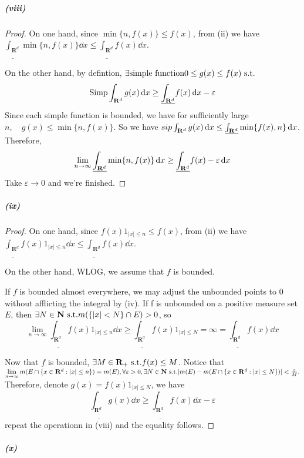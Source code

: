 \documentclass{article}
\begin{document}
\subparagraph{(viii)}
\begin{proof}
On one hand, since $\min\{n,f(x)\}\leq f(x)$, from (ii) we have $\underline{\int_{\mathbf{R}^d}}\min\{n,f(x)\}\dd x\leq \underline{\int_{\mathbf{R}^d}}f(x)\dd x$. 

On the other hand, by defintion, $\exists \text{simple function} 0\leq g(x)\leq f(x)\text{ s.t.}$ 
\[\mathrm{Simp}\int_{\mathbf{R}^d}g(x)\,\mathrm{d} x\geq \underline{\int_{\mathbf{R}^d}}f(x)\,\mathrm{d} x-\varepsilon\]
Since each simple function is bounded, we have for sufficiently large $n,\quad g(x)\leq \min\{n, f(x)\}$. So we have $\\sip\int_{\mathbf{R}^d}g(x)\,\mathrm{d} x\leq \underline{\int_{\mathbf{R}^d}}\min\{f(x),n\}\,\mathrm{d} x$. Therefore,
\[\lim_{n\to\infty}\uline{\int_{\mathbf{R}^d}}\min\{n,f(x)\}\dd x\geq \uline{\int_{\mathbf{R}^d}}f(x)-\varepsilon\dd x\]
Take $\varepsilon\to 0$ and we're finished. 
\end{proof}
\subparagraph{(ix)}
\begin{proof}
On one hand, since $f(x)1_{|x|\leq n}\leq f(x)$, from (ii) we have $\underline{\int_{\mathbf{R}^d}}f(x)1_{|x|\leq n}\dd x\leq \underline{\int_{\mathbf{R}^d}}f(x)\dd x$.

On the other hand, WLOG, we assume that $f$ is bounded.

If $f$ is bounded almost everywhere, we may adjust the unbounded points to 0 without afflicting the integral by (iv). If f is unbounded on a positive measure set $E$, then $\exists N\in\mathbf{N}\text{ s.t.} m(\{|x|<N\}\cap E)>0$, so \[\lim\limits_{n\to\infty}\underline{\int_{\mathbf{R}^d}}f(x)1_{|x|\leq n}\dd x\geq \underline{\int_{\mathbf{R}^d}}f(x)1_{|x|\leq N}=\infty=\underline{\int_{\mathbf{R}^d}}f(x)\dd x\]

Now that $f$ is bounded, $\exists M\in\mathbf{R}_+\text{ s.t.} f(x)\leq M$. Notice that $\lim\limits_{n\to\infty}m(E\cap\{x\in\mathbf{R}^d:|x|\leq n\})=m(E), \forall \varepsilon >0,\exists N\in\mathbf{N}\text{ s.t.} |m(E)-m(E\cap\{x\in\mathbf{R}^d:|x|\leq N\})|<\frac{\varepsilon}{M}.$ Therefore, denote $g(x)=f(x)1_{|x|\leq N}$, we have
\[\underline{\int_{\mathbf{R}^d}}g(x)\dd x\geq \underline{\int_{\mathbf{R}^d}}f(x)\dd x-\varepsilon\]
repeat the operationn in (viii) and the equality follows.
\end{proof}
\subparagraph{(x)}
\end{document}
